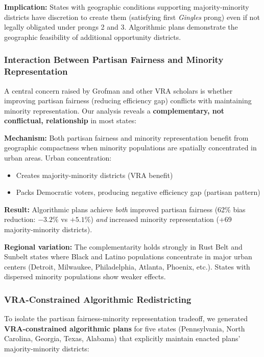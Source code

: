 \textbf{Implication:} States with geographic conditions supporting majority-minority districts have discretion to create them (satisfying first \emph{Gingles} prong) even if not legally obligated under prongs 2 and 3. Algorithmic plans demonstrate the geographic feasibility of additional opportunity districts.

\subsubsection{Interaction Between Partisan Fairness and Minority Representation}

A central concern raised by Grofman and other VRA scholars is whether improving partisan fairness (reducing efficiency gap) conflicts with maintaining minority representation. Our analysis reveals a \textbf{complementary, not conflictual, relationship} in most states:

\textbf{Mechanism:} Both partisan fairness and minority representation benefit from geographic compactness when minority populations are spatially concentrated in urban areas. Urban concentration:
\begin{itemize}
    \item Creates majority-minority districts (VRA benefit)
    \item Packs Democratic voters, producing negative efficiency gap (partisan pattern)
\end{itemize}

\textbf{Result:} Algorithmic plans achieve \emph{both} improved partisan fairness (62\% bias reduction: $-3.2\%$ vs $+5.1\%$) \emph{and} increased minority representation (+69 majority-minority districts).

\textbf{Regional variation:} The complementarity holds strongly in Rust Belt and Sunbelt states where Black and Latino populations concentrate in major urban centers (Detroit, Milwaukee, Philadelphia, Atlanta, Phoenix, etc.). States with dispersed minority populations show weaker effects.

\subsubsection{VRA-Constrained Algorithmic Redistricting}

To isolate the partisan fairness-minority representation tradeoff, we generated \textbf{VRA-constrained algorithmic plans} for five states (Pennsylvania, North Carolina, Georgia, Texas, Alabama) that explicitly maintain enacted plans' majority-minority districts:

